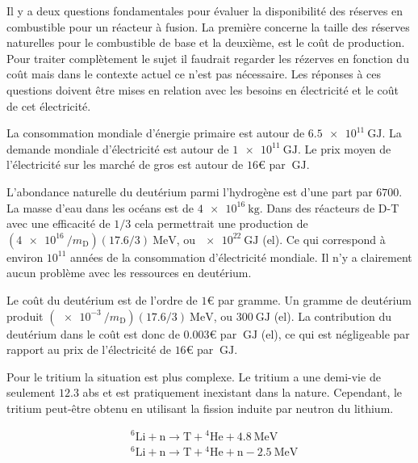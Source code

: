 \documentclass[main.tex]{subfiles}
\begin{document}
Il y a deux questions fondamentales pour évaluer la disponibilité des réserves en combustible pour un réacteur à fusion.
La première concerne la taille des réserves naturelles pour le combustible de base et la deuxième, est le coût de production.
Pour traiter complètement le sujet il faudrait regarder les rézerves en fonction du coût mais dans le contexte actuel ce n'est pas nécessaire.
Les réponses à ces questions doivent être mises en relation avec les besoins en électricité et le coût de cet électricité.

La consommation mondiale d'énergie primaire est autour de \( \SI{6.5e11}{\giga\joule} \).
La demande mondiale d'électricité est autour de \( \SI{1e11}{\giga\joule} \).
Le prix moyen de l'électricité sur les marché de gros est autour de \( 16 \text{€} \) par \( \SI{}{\giga\joule} \).

L'abondance naturelle du deutérium parmi l'hydrogène est d'une part par \( 6700 \). La masse d'eau dans les océans est de \( \SI{4e16}{\kilogram} \).
Dans des réacteurs de D-T avec une efficacité de \( 1/3 \) cela permettrait une production de \( \left( \SI{4e16}{}/m_{\text{D}} \right) \left( 17.6/3 \right) \SI{}{\mega\electronvolt} \), ou \( \SI{e22}{\giga\joule} \) (el).
Ce qui correspond à environ \( 10^{11} \) années de la consommation d'électricité mondiale.
Il n'y a clairement aucun problème avec les ressources en deutérium.

Le coût du deutérium est de l'ordre de \( 1 \)€ par gramme.
Un gramme de deutérium produit \( \left( \SI{e-3}{}/m_{\text{D}} \right) \left( 17.6/3 \right) \SI{}{\mega\electronvolt} \), ou \( \SI{300}{\giga\joule} \) (el).
La contribution du deutérium dans le coût est donc de \( 0.003 \)€ par \( \SI{}{\giga\joule} \) (el), ce qui est négligeable par rapport au prix de l'électricité de \( 16 \text{€} \) par \( \SI{}{\giga\joule} \).

Pour le tritium la situation est plus complexe.
Le tritium a une demi-vie de seulement \( 12.3 \) abs et est pratiquement inexistant  dans la nature.
Cependant, le tritium peut-être obtenu en utilisant la fission induite par neutron du lithium.

\begin{align*}
	&^6\text{Li} + \text{n} \rightarrow \text{T} + {}^4\text{He} + \SI{4.8}{\mega\electronvolt}\\
	&^6\text{Li} + \text{n} \rightarrow \text{T} + {}^4\text{He} + \text{n} - \SI{2.5}{\mega\electronvolt}
\end{align*}
\end{document}
